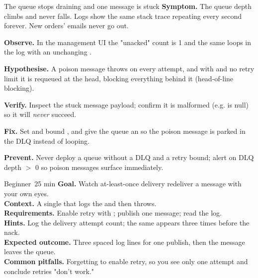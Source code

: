 \begin{debuglab}{The queue stops draining and one message is stuck}
\textbf{Symptom.} The  queue depth climbs and never falls. Logs show the same stack trace repeating every second forever. New orders' emails never go out.

\begin{tickcheck}
  \item \textbf{Observe.} In the management UI the "unacked" count is 1 and the same  loops in the log with an unchanging .
  \item \textbf{Hypothesise.} A poison message throws on every attempt, and with  and no retry limit it is requeued at the head, blocking everything behind it (head-of-line blocking).
  \item \textbf{Verify.} Inspect the stuck message payload; confirm it is malformed (e.g.  is null) so it will \emph{never} succeed.
  \item \textbf{Fix.} Set  and bound , and give the queue an  so the poison message is parked in the DLQ instead of looping.
  \item \textbf{Prevent.} Never deploy a queue without a DLQ and a retry bound; alert on DLQ depth $>$ 0 so poison messages surface immediately.
\end{tickcheck}
\end{debuglab}


\begin{minilab}{Beginner}{~25 min}
\textbf{Goal.} Watch at-least-once delivery redeliver a message with your own eyes.\\
\textbf{Context.} A single  that logs the  and then throws.\\
\textbf{Requirements.} Enable retry with ; publish one message; read the log.\\
\textbf{Hints.} Log the delivery attempt count; the same  appears three times before the nack.\\
\textbf{Expected outcome.} Three spaced log lines for one publish, then the message leaves the queue.\\
\textbf{Common pitfalls.} Forgetting to enable retry, so you see only one attempt and conclude retries "don't work."
\end{minilab}

